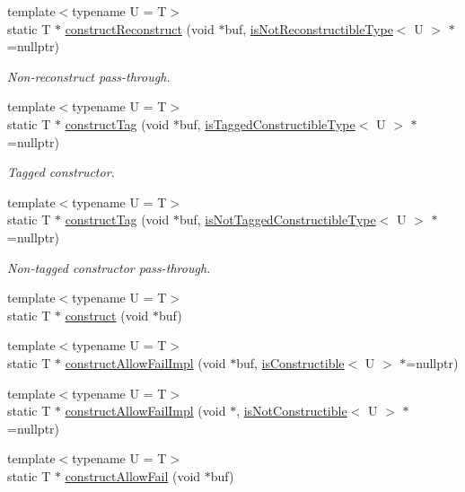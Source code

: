 \begin{DoxyCompactItemize}
\item 
{\footnotesize template$<$typename U  = T$>$ }\\static T $\ast$ \hyperlink{structcheckpoint_1_1dispatch_1_1_reconstructor_a8a504054312ef8e5703d938cc2ef75be}{construct\+Reconstruct} (void $\ast$buf, \hyperlink{namespacecheckpoint_a0054cbef71b90d6860e1d3916cf9d299}{is\+Not\+Reconstructible\+Type}$<$ U $>$ $\ast$=nullptr)
\begin{DoxyCompactList}\small\item\em Non-\/reconstruct pass-\/through. \end{DoxyCompactList}\item 
{\footnotesize template$<$typename U  = T$>$ }\\static T $\ast$ \hyperlink{structcheckpoint_1_1dispatch_1_1_reconstructor_ac702decacef9a6ef4d0cf5492187b9ab}{construct\+Tag} (void $\ast$buf, \hyperlink{namespacecheckpoint_abff0f367c546c94ce857d200153d990f}{is\+Tagged\+Constructible\+Type}$<$ U $>$ $\ast$=nullptr)
\begin{DoxyCompactList}\small\item\em Tagged constructor. \end{DoxyCompactList}\item 
{\footnotesize template$<$typename U  = T$>$ }\\static T $\ast$ \hyperlink{structcheckpoint_1_1dispatch_1_1_reconstructor_a116025ae56a26ed4d6a51b999f57fd47}{construct\+Tag} (void $\ast$buf, \hyperlink{namespacecheckpoint_a4eb64ee16bff7ef1609e5b98cb16cfb6}{is\+Not\+Tagged\+Constructible\+Type}$<$ U $>$ $\ast$=nullptr)
\begin{DoxyCompactList}\small\item\em Non-\/tagged constructor pass-\/through. \end{DoxyCompactList}\item 
{\footnotesize template$<$typename U  = T$>$ }\\static T $\ast$ \hyperlink{structcheckpoint_1_1dispatch_1_1_reconstructor_a31a927731c0b265003a416e8d20616a1}{construct} (void $\ast$buf)
\item 
{\footnotesize template$<$typename U  = T$>$ }\\static T $\ast$ \hyperlink{structcheckpoint_1_1dispatch_1_1_reconstructor_ac4eac94cd715ae6637f5f5c52bb78584}{construct\+Allow\+Fail\+Impl} (void $\ast$buf, \hyperlink{namespacecheckpoint_a48ec2649d5cbd890f67ea1193cc0d51a}{is\+Constructible}$<$ U $>$ $\ast$=nullptr)
\item 
{\footnotesize template$<$typename U  = T$>$ }\\static T $\ast$ \hyperlink{structcheckpoint_1_1dispatch_1_1_reconstructor_aaec0b8d76f177fd7e1ce58e754ac04d4}{construct\+Allow\+Fail\+Impl} (void $\ast$, \hyperlink{namespacecheckpoint_a14b3c81988a2c2d3c935edcc653b6322}{is\+Not\+Constructible}$<$ U $>$ $\ast$=nullptr)
\item 
{\footnotesize template$<$typename U  = T$>$ }\\static T $\ast$ \hyperlink{structcheckpoint_1_1dispatch_1_1_reconstructor_afbfa29526948dda3d9d843a377f526fc}{construct\+Allow\+Fail} (void $\ast$buf)
\end{DoxyCompactItemize}


